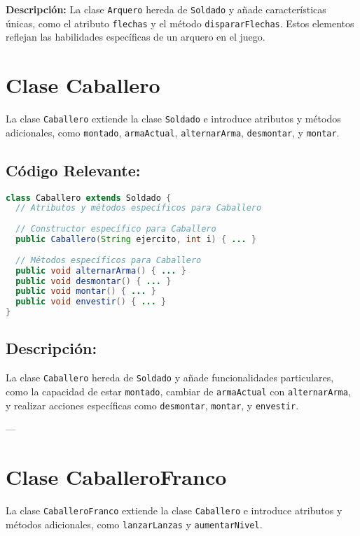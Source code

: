 \textbf{Descripción:} La clase \texttt{Arquero} hereda de \texttt{Soldado} y añade características únicas, como el atributo \texttt{flechas} y el método \texttt{dispararFlechas}. Estos elementos reflejan las habilidades específicas de un arquero en el juego.


\section{Clase Caballero}

La clase \texttt{Caballero} extiende la clase \texttt{Soldado} e introduce atributos y métodos adicionales, como \texttt{montado}, \texttt{armaActual}, \texttt{alternarArma}, \texttt{desmontar}, y \texttt{montar}.

\subsection*{Código Relevante:}

\begin{lstlisting}[language=Java]
class Caballero extends Soldado {
  // Atributos y métodos específicos para Caballero
  
  // Constructor específico para Caballero
  public Caballero(String ejercito, int i) { ... }
  
  // Métodos específicos para Caballero
  public void alternarArma() { ... }
  public void desmontar() { ... }
  public void montar() { ... }
  public void envestir() { ... }
}
\end{lstlisting}

\subsection*{Descripción:}

La clase \texttt{Caballero} hereda de \texttt{Soldado} y añade funcionalidades particulares, como la capacidad de estar \texttt{montado}, cambiar de \texttt{armaActual} con \texttt{alternarArma}, y realizar acciones específicas como \texttt{desmontar}, \texttt{montar}, y \texttt{envestir}.

---

\section{Clase CaballeroFranco}

La clase \texttt{CaballeroFranco} extiende la clase \texttt{Caballero} e introduce atributos y métodos adicionales, como \texttt{lanzarLanzas} y \texttt{aumentarNivel}.

